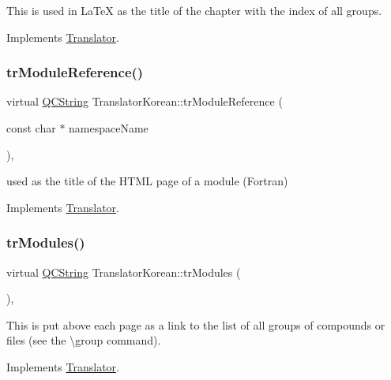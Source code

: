 This is used in La\+TeX as the title of the chapter with the index of all groups. 

Implements \mbox{\hyperlink{class_translator}{Translator}}.

\mbox{\label{class_translator_korean_acaf8215a2008b2a3dd13916be0dbc3f3}} 
\subsubsection{\texorpdfstring{trModuleReference()}{trModuleReference()}}
{\footnotesize\ttfamily virtual \mbox{\hyperlink{class_q_c_string}{Q\+C\+String}} Translator\+Korean\+::tr\+Module\+Reference (\begin{DoxyParamCaption}\item[{const char $\ast$}]{namespace\+Name }\end{DoxyParamCaption})\hspace{0.3cm}{\ttfamily [inline]}, {\ttfamily [virtual]}}

used as the title of the H\+T\+ML page of a module (Fortran) 

Implements \mbox{\hyperlink{class_translator}{Translator}}.

\mbox{\label{class_translator_korean_ac801e4392e5f7529932197b6e8f0df58}} 
\subsubsection{\texorpdfstring{trModules()}{trModules()}}
{\footnotesize\ttfamily virtual \mbox{\hyperlink{class_q_c_string}{Q\+C\+String}} Translator\+Korean\+::tr\+Modules (\begin{DoxyParamCaption}{ }\end{DoxyParamCaption})\hspace{0.3cm}{\ttfamily [inline]}, {\ttfamily [virtual]}}

This is put above each page as a link to the list of all groups of compounds or files (see the \textbackslash{}group command). 

Implements \mbox{\hyperlink{class_translator}{Translator}}.

